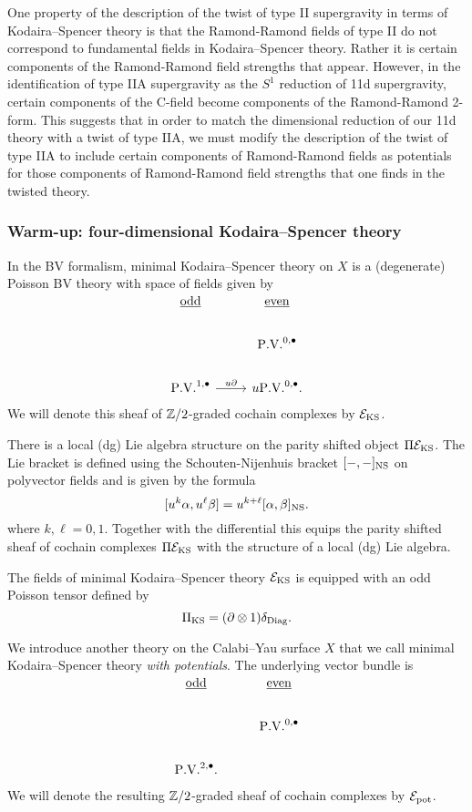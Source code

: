\documentclass[11pt]{amsart}
\begin{document}
One property of the description of the twist of type II supergravity in terms of Kodaira--Spencer theory is that the Ramond-Ramond fields of type II do not correspond to fundamental fields in Kodaira--Spencer theory. Rather it is certain components of the Ramond-Ramond field strengths that appear. However, in the identification of type IIA supergravity as the $S^{1}$ reduction of 11d supergravity, certain components of the C-field become components of the Ramond-Ramond 2-form. This suggests that in order to match the dimensional reduction of our 11d theory with a twist of type IIA, we must modify the description of the twist of type IIA to include certain components of Ramond-Ramond fields as potentials for those components of Ramond-Ramond field strengths that one finds in the twisted theory.

\subsubsection{Warm-up: four-dimensional Kodaira--Spencer theory}
\label{sec:org91dc4ca}
In the BV formalism, minimal Kodaira--Spencer theory on $X$ is a (degenerate) Poisson BV theory with space of fields given by
\[
\begin{tikzcd}
\ul{\rm odd} & \ul{\rm even} \\
 & \PV^{0,\bu} \\
 \PV^{1,\bu} \ar[r, "u \partial"] & u \PV^{0,\bu} .
\end{tikzcd}
\]
We will denote this sheaf of $\mathbb Z /2$-graded cochain complexes by $\mathcal E_{\rm KS}$.

There is a local (dg) Lie algebra structure on the parity shifted object $\Pi \mathcal E_{\rm KS}$.
The Lie bracket is defined using the Schouten-Nijenhuis bracket $[-,-]_{\rm NS}$ on polyvector fields and is given by the formula
\[
[u^k \alpha , u^\ell \beta] = u^{k+\ell} [\alpha, \beta]_{\rm NS} .
\]
where $k, \ell = 0,1$.
Together with the differential this equips the parity shifted sheaf of cochain complexes $\Pi \mathcal E_{\rm KS}$ with the structure of a local (dg) Lie algebra.

The fields of minimal Kodaira--Spencer theory $\mathcal E_{\rm KS}$ is equipped with an odd Poisson tensor defined by
\[
\Pi_{\rm KS} = (\partial \otimes 1) \delta_{\rm Diag} .
\]

We introduce another theory on the Calabi--Yau surface $X$ that we call minimal Kodaira--Spencer theory {\em with potentials}.
The underlying vector bundle is
\[
\begin{tikzcd}
\ul{\rm odd} & \ul{\rm even} \\
 & \PV^{0,\bu} \\
 \PV^{2,\bu}  .
\end{tikzcd}
\]
We will denote the resulting $\mathbb Z /2$-graded sheaf of cochain complexes by $\mathcal E_{\rm pot}$.
\end{document}
